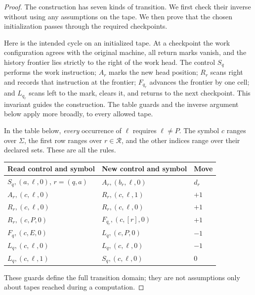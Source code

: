 \documentclass[11pt]{article}
\theoremstyle{remark}
\begin{document}
\begin{proof}
The construction has seven kinds of transition. We first check their inverse
without using any assumptions on the tape. We then prove that the chosen
initialization passes through the required checkpoints.

Here is the intended cycle on an initialized tape. At a checkpoint the
work configuration agrees with the original machine, all return marks
vanish, and the history frontier lies strictly to the right of the work
head. The control $S_q$ performs the work instruction; $A_r$ marks the new
head position; $R_r$ scans right and records that instruction at the
frontier; $F_{q_r}$ advances the frontier by one cell; and $L_{q_r}$ scans
left to the mark, clears it, and returns to the next checkpoint. This
invariant guides the construction. The table guards and the inverse
argument below apply more broadly, to every allowed tape.

\medskip
\noindent In the table below, \emph{every} occurrence of $\ell$ requires
$\ell\ne P$. The symbol $c$ ranges over $\Sigma$, the first row ranges
over $r\in\mathcal R$, and the other indices range over their declared
sets. These are all the rules.
\begin{center}
\renewcommand{\arraystretch}{1.16}
\begin{tabular}{@{}lll@{}}
\toprule
Read control and symbol & New control and symbol & Move\\
\midrule
$S_q,(a,\ell,0)$, $r=(q,a)$ & $A_r,(b_r,\ell,0)$ & $d_r$\\
$A_r,(c,\ell,0)$ & $R_r,(c,\ell,1)$ & $+1$\\
$R_r,(c,\ell,0)$ & $R_r,(c,\ell,0)$ & $+1$\\
$R_r,(c,P,0)$ & $F_{q_r},(c,[r],0)$ & $+1$\\
$F_q,(c,E,0)$ & $L_q,(c,P,0)$ & $-1$\\
$L_q,(c,\ell,0)$ & $L_q,(c,\ell,0)$ & $-1$\\
$L_q,(c,\ell,1)$ & $S_q,(c,\ell,0)$ & $0$\\
\bottomrule
\end{tabular}
\end{center}
These guards define the full transition domain; they are not assumptions
only about tapes reached during a computation.


\end{proof}
\end{document}

